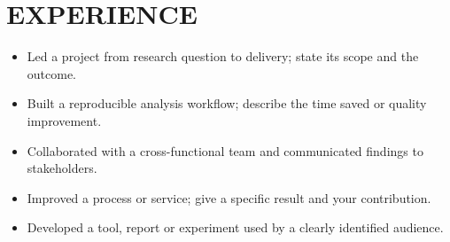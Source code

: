 \section{EXPERIENCE}
\begin{itemize}
\item Led a project from research question to delivery; state its scope and the outcome.
\item Built a reproducible analysis workflow; describe the time saved or quality improvement.
\item Collaborated with a cross-functional team and communicated findings to stakeholders.
\end{itemize}
\vspace{3pt}
\begin{itemize}
\item Improved a process or service; give a specific result and your contribution.
\item Developed a tool, report or experiment used by a clearly identified audience.
\end{itemize}
